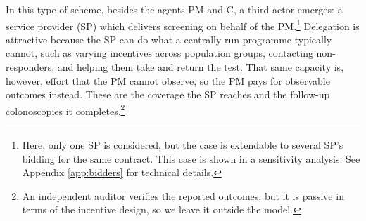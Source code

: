 \documentclass[12pt]{article}
\begin{document}
In this type of scheme, besides the agents PM and C, a third actor emerges: a service provider (SP) which delivers screening on behalf of the PM.\footnote{Here, only one SP is considered, but the case is extendable to several SP's bidding for the same contract. This case is shown in a sensitivity analysis. See Appendix \ref{app:bidders} for technical details.} Delegation is attractive because the SP can do what a centrally run programme typically cannot, such as varying incentives across population groups, contacting non-responders, and helping them take and return the test. That same capacity is, however, effort that the PM cannot observe, so the PM pays for observable outcomes instead. These are the coverage the SP reaches and the follow-up colonoscopies it completes.\footnote{An independent auditor verifies the reported outcomes, but it is passive in terms of the incentive design, so we leave it outside the model.}
\end{document}
